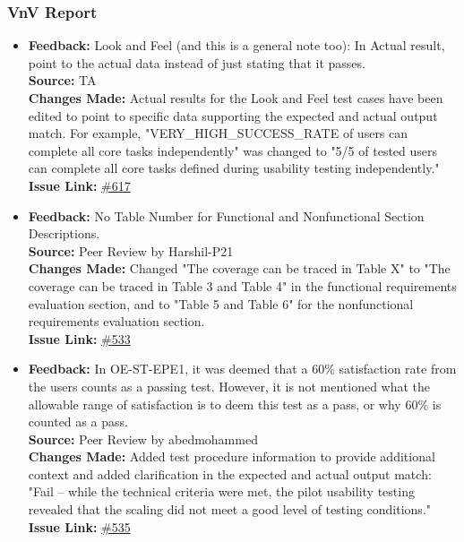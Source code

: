 \documentclass{article}
\begin{document}
\subsubsection{VnV Report}

\begin{itemize}
  \item 
    \textbf{Feedback:} Look and Feel (and this is a general note too): In Actual result, point to the actual data instead of just stating that it passes. \\
    \textbf{Source:} TA \\
    \textbf{Changes Made:} Actual results for the Look and Feel test cases have been edited to point to specific data supporting the expected and actual output match. For example, "VERY\_HIGH\_SUCCESS\_RATE of users can complete all core tasks independently" was changed to "5/5 of tested users can complete all core tasks defined during usability testing independently."\\
    \textbf{Issue Link:} \href{https://github.com/parishanizam/TeleHealth/issues/617}{\#617}

  \item 
    \textbf{Feedback:} No Table Number for Functional and Nonfunctional Section Descriptions. \\
    \textbf{Source:} Peer Review by Harshil-P21 \\
    \textbf{Changes Made:} Changed "The coverage can be traced in Table X" to "The coverage can be traced in Table 3 and Table 4" in the functional requirements evaluation section, and to "Table 5 and Table 6" for the nonfunctional requirements evaluation section. \\
    \textbf{Issue Link:} \href{https://github.com/parishanizam/TeleHealth/issues/533}{\#533}
    
  \item 
    \textbf{Feedback:} In OE-ST-EPE1, it was deemed that a 60\% satisfaction rate from the users counts as a passing test. However, it is not mentioned what the allowable range of satisfaction is to deem this test as a pass, or why 60\% is counted as a pass. \\
    \textbf{Source:} Peer Review by abedmohammed \\
    \textbf{Changes Made:} Added test procedure information to provide additional context and added clarification in the expected and actual output match: "Fail – while the technical criteria were met, the pilot usability testing revealed that the scaling did not meet a good level of testing conditions." \\
    \textbf{Issue Link:} \href{https://github.com/parishanizam/TeleHealth/issues/536}{\#535}


\end{itemize}
\end{document}
